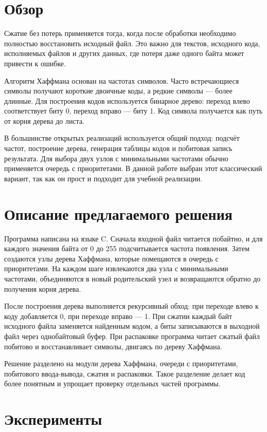 \documentclass[14pt,a4paper]{extarticle}
\begin{document}
\section{Обзор}

Сжатие без потерь применяется тогда, когда после обработки необходимо полностью восстановить исходный файл. Это важно для текстов, исходного кода, исполняемых файлов и других данных, где потеря даже одного байта может привести к ошибке.

Алгоритм Хаффмана основан на частотах символов. Часто встречающиеся символы получают короткие двоичные коды, а редкие символы --- более длинные. Для построения кодов используется бинарное дерево: переход влево соответствует биту 0, переход вправо --- биту 1. Код символа получается как путь от корня дерева до листа.

В большинстве открытых реализаций используется общий подход: подсчёт частот, построение дерева, генерация таблицы кодов и побитовая запись результата. Для выбора двух узлов с минимальными частотами обычно применяется очередь с приоритетами. В данной работе выбран этот классический вариант, так как он прост и подходит для учебной реализации.

\section{Описание предлагаемого решения}

Программа написана на языке C. Сначала входной файл читается побайтно, и для каждого значения байта от 0 до 255 подсчитывается частота появления. Затем создаются узлы дерева Хаффмана, которые помещаются в очередь с приоритетами. На каждом шаге извлекаются два узла с минимальными частотами, объединяются в новый родительский узел и возвращаются обратно до получения корня дерева.

После построения дерева выполняется рекурсивный обход: при переходе влево к коду добавляется 0, при переходе вправо --- 1. При сжатии каждый байт исходного файла заменяется найденным кодом, а биты записываются в выходной файл через однобайтовый буфер. При распаковке программа читает сжатый файл побитово и восстанавливает символы, двигаясь по дереву Хаффмана.

Решение разделено на модули дерева Хаффмана, очереди с приоритетами, побитового ввода-вывода, сжатия и распаковки. Такое разделение делает код более понятным и упрощает проверку отдельных частей программы.

\section{Эксперименты}
\end{document}

